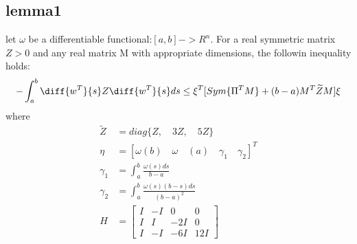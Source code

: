 \documentclass[journal]{IEEEtran}
\begin{document}
 \subsection{lemma1}
 let $\omega$ be a differentiable functional:$[a,b] -> R^n$. For a real symmetric matrix $Z>0$ and any real matrix M with appropriate
 dimensions, the followin inequality holds:
 \begin{equation}
   -\int _a^b \diff{w^T}{s}Z\diff{w^T}{s}ds \leq \xi ^T[Sym\{\Pi ^T M\}+(b-a)M^T\widetilde{Z}M]\xi
 \end{equation}
 where
 \begin{align}
   \widetilde{Z}&=diag\{Z,\quad 3Z,\quad 5Z\} \\
   \eta&=[\omega (b) \quad \omega \quad (a) \quad \gamma _1 \quad \gamma _2]^T \\
   \gamma _1 &= \int _a ^b \frac{\omega (s)ds}{b-a} \\
   \gamma _2 &= \int _a ^b \frac{\omega (s)(b-s)ds}{(b-a)^2} \\
   H &=
   \begin{bmatrix}
     I& -I &0 &0 \\
     I& I &-2I &0 \\
     I& -I &-6I &12I
   \end{bmatrix}
 \end{align}
\end{document}
